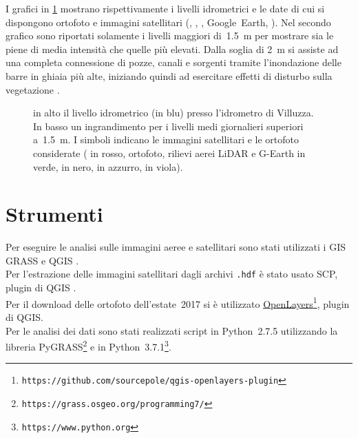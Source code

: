 I grafici in \cref{graph:livelli-orto-sat} mostrano rispettivamente i livelli idrometrici e le date di cui si dispongono ortofoto e immagini satellitari (\AST{}, \Pl{}, \Se{}, Google~Earth, \WV{}). 
Nel secondo grafico sono riportati solamente i livelli maggiori di~\SI{1.5}{\m} per mostrare sia le piene di media intensità che quelle più elevati.
Dalla soglia di \SI{2}{\m} si assiste ad una completa connessione di pozze, canali e sorgenti tramite l'inondazione delle barre in ghiaia più alte, iniziando quindi ad esercitare effetti di disturbo sulla vegetazione .
%
\begin{figure}[p]
	\centering
	
	
	\caption[livelli idrometrici e foto aeree - satellitari]{in alto il livello idrometrico (in blu) presso l'idrometro di Villuzza. 
	In basso un ingrandimento per i livelli medi giornalieri superiori a~\SI{1.5}{\m}. I simboli indicano le immagini satellitari e le ortofoto considerate (\AST{} in rosso, ortofoto, rilievi aerei LiDAR e G-Earth in verde, \Pl{} in nero, \Se{} in azzurro, \WV{} in viola).}
	\label{graph:livelli-orto-sat}
\end{figure}



\section{Strumenti}
Per eseguire le analisi sulle immagini aeree e satellitari sono stati utilizzati i GIS GRASS  e QGIS . 
\\
Per l'estrazione delle immagini satellitari \AST{} dagli archivi \texttt{.hdf} è stato usato SCP, plugin di QGIS . 
\\
Per il download delle ortofoto dell'estate~2017 si è utilizzato \href{https://github.com/sourcepole/qgis-openlayers-plugin}{OpenLayers}\footnote{\texttt{https://github.com/sourcepole/qgis-openlayers-plugin}}, plugin di QGIS.
\\
Per le analisi dei dati sono stati realizzati script in Python~2.7.5 utilizzando la libreria PyGRASS\footnote{\texttt{https://grass.osgeo.org/programming7/}}  e in Python~3.7.1\footnote{\texttt{https://www.python.org}}.
